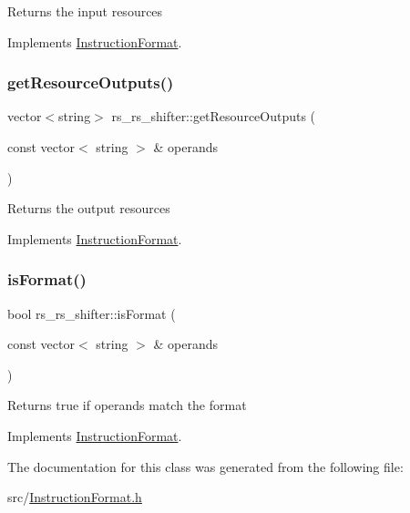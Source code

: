 Returns the input resources 

Implements \hyperlink{classInstructionFormat_a09775d3a3c22f40a0f44504664e586e4}{Instruction\+Format}.

\mbox{\label{classrs__rs__shifter_a1f34f4ebe7ad98f670811d9a43629fdb}} 
\subsubsection{\texorpdfstring{get\+Resource\+Outputs()}{getResourceOutputs()}}
{\footnotesize\ttfamily vector$<$string$>$ rs\+\_\+rs\+\_\+shifter\+::get\+Resource\+Outputs (\begin{DoxyParamCaption}\item[{const vector$<$ string $>$ \&}]{operands }\end{DoxyParamCaption})\hspace{0.3cm}{\ttfamily [virtual]}}

Returns the output resources 

Implements \hyperlink{classInstructionFormat_a95cd28ffb1bde59b67f676880ab10536}{Instruction\+Format}.

\mbox{\label{classrs__rs__shifter_a0d8deef39f7613736c69008bedfb0265}} 
\subsubsection{\texorpdfstring{is\+Format()}{isFormat()}}
{\footnotesize\ttfamily bool rs\+\_\+rs\+\_\+shifter\+::is\+Format (\begin{DoxyParamCaption}\item[{const vector$<$ string $>$ \&}]{operands }\end{DoxyParamCaption})\hspace{0.3cm}{\ttfamily [virtual]}}

Returns true if operands match the format 

Implements \hyperlink{classInstructionFormat_a9fdcf94dcd7d9a55ba86e7a63f04d1fe}{Instruction\+Format}.



The documentation for this class was generated from the following file\+:\begin{DoxyCompactItemize}
\item 
src/\hyperlink{InstructionFormat_8h}{Instruction\+Format.\+h}\end{DoxyCompactItemize}
